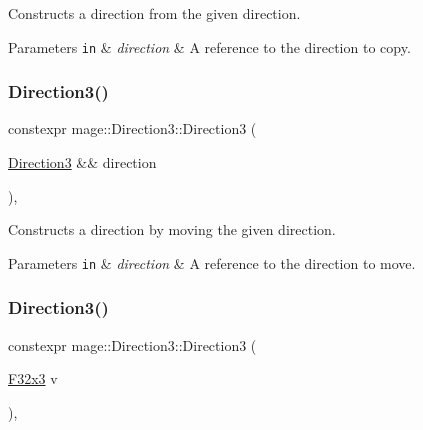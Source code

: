 Constructs a direction from the given direction.


\begin{DoxyParams}[1]{Parameters}
\mbox{\tt in}  & {\em direction} & A reference to the direction to copy. \\
\hline
\end{DoxyParams}
\mbox{\label{structmage_1_1_direction3_aff1506b32f2b6dd49c2747eca90c76ce}} 
\subsubsection{\texorpdfstring{Direction3()}{Direction3()}\hspace{0.1cm}{\footnotesize\ttfamily [4/5]}}
{\footnotesize\ttfamily constexpr mage\+::\+Direction3\+::\+Direction3 (\begin{DoxyParamCaption}\item[{\mbox{\hyperlink{structmage_1_1_direction3}{Direction3}} \&\&}]{direction }\end{DoxyParamCaption})\hspace{0.3cm}{\ttfamily [default]}, {\ttfamily [noexcept]}}

Constructs a direction by moving the given direction.


\begin{DoxyParams}[1]{Parameters}
\mbox{\tt in}  & {\em direction} & A reference to the direction to move. \\
\hline
\end{DoxyParams}
\mbox{\label{structmage_1_1_direction3_a9ef3fe2fd9fd55fade378d42eda597c3}} 
\subsubsection{\texorpdfstring{Direction3()}{Direction3()}\hspace{0.1cm}{\footnotesize\ttfamily [5/5]}}
{\footnotesize\ttfamily constexpr mage\+::\+Direction3\+::\+Direction3 (\begin{DoxyParamCaption}\item[{\mbox{\hyperlink{namespacemage_a0fef5ab4e073c2d9ea876fefa3da4233}{F32x3}}}]{v }\end{DoxyParamCaption})\hspace{0.3cm}{\ttfamily [explicit]}, {\ttfamily [noexcept]}}

